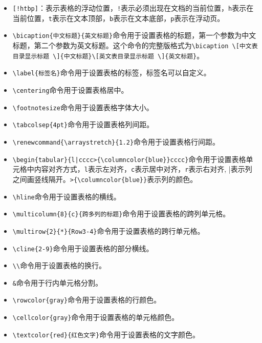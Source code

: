 \begin{itemize}
    \item \texttt{[!htbp]}：表示表格的浮动位置，\texttt{!}表示必须出现在文档的当前位置，\texttt{h}表示在当前位置，\texttt{t}表示在文本顶部，\texttt{b}表示在文本底部，\texttt{p}表示在浮动页。
    \item \texttt{\textbackslash bicaption\{中文标题\}\{英文标题\}}命令用于设置表格的标题，第一个参数为中文标题，第二个参数为英文标题。这个命令的完整版格式为\texttt{\textbackslash bicaption \textbackslash [中文表目录显示标题 \textbackslash ]\{中文标题\}\textbackslash [英文表目录显示标题 \textbackslash ]\{英文标题\}}。
    \item \texttt{\textbackslash label\{标签名\}}命令用于设置表格的标签，标签名可以自定义。
    \item \texttt{\textbackslash centering}命令用于设置表格居中。
    \item \texttt{\textbackslash footnotesize}命令用于设置表格字体大小。
    \item \texttt{\textbackslash tabcolsep\{4pt\}}命令用于设置表格列间距。
    \item \texttt{\textbackslash renewcommand\{\textbackslash arraystretch\}\{1.2\}}命令用于设置表格行间距。
    \item \texttt{\textbackslash begin\{tabular\}\{l|cccc>\{\textbackslash columncolor\{blue\}\}cccc\}}命令用于设置表格单元格中内容对齐方式，\texttt{l}表示左对齐，\texttt{c}表示居中对齐，\texttt{r}表示右对齐, |表示列之间画竖线隔开。\texttt{>\{\textbackslash columncolor\{blue\}\}}表示列的颜色。
    \item \texttt{\textbackslash hline}命令用于设置表格的横线。
    \item \texttt{\textbackslash multicolumn\{8\}\{c\}\{跨多列的标题\}}命令用于设置表格的跨列单元格。
    \item \texttt{\textbackslash multirow\{2\}\{*\}\{Row3-4\}}命令用于设置表格的跨行单元格。
    \item \texttt{\textbackslash cline\{2-9\}}命令用于设置表格的部分横线。
    \item \texttt{\textbackslash \textbackslash}命令用于设置表格的换行。
    \item \texttt{\&}命令用于行内单元格分割。
    \item \texttt{\textbackslash rowcolor\{gray\}}命令用于设置表格的行颜色。
    \item \texttt{\textbackslash cellcolor\{gray\}}命令用于设置表格的单元格颜色。
    \item \texttt{\textbackslash textcolor\{red\}\{红色文字\}}命令用于设置表格的文字颜色。
\end{itemize}
